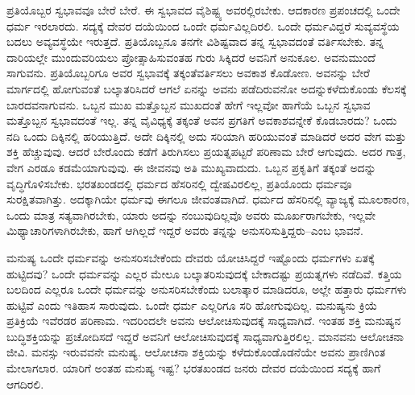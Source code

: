 ಪ್ರತಿಯೊಬ್ಬರ ಸ್ವಭಾವವೂ ಬೇರೆ ಬೇರೆ. ಈ ಸ್ವಭಾವದ ವೈಶಿಷ್ಟ್ಯ ಅವರಲ್ಲಿರಬೇಕು. ಆದಕಾರಣ ಪ್ರಪಂಚದಲ್ಲಿ ಒಂದೇ ಧರ್ಮ ಇರಲಾರದು. ಸದ್ಯಕ್ಕೆ ದೇವರ ದಯೆಯಿಂದ ಒಂದೇ ಧರ್ಮವಿಲ್ಲದಿರಲಿ. ಒಂದೇ ಧರ್ಮವಿದ್ದರೆ ಸುವ್ಯವಸ್ಥೆಯ ಬದಲು ಅವ್ಯವಸ್ಥೆಯೇ ಇರುತ್ತದೆ. ಪ್ರತಿಯೊಬ್ಬನೂ ತನಗೇ ವಿಶಿಷ್ಟವಾದ ತನ್ನ ಸ್ವಭಾವದಂತೆ ವರ್ತಿಸಬೇಕು. ತನ್ನ ದಾರಿಯಲ್ಲೇ ಮುಂದುವರಿಯಲು ಪ್ರೋತ್ಸಾಹಿಸುವಂತಹ ಗುರು ಸಿಕ್ಕಿದರೆ ಅವನಿಗೆ ಅನುಕೂಲ. ಅವನು\break ಮುಂದೆ ಸಾಗುವನು. ಪ್ರತಿಯೊಬ್ಬರಿಗೂ ಅವರ ಸ್ವಭಾವಕ್ಕೆ ತಕ್ಕಂತೆ\break ವರ್ತಿಸಲು ಅವಕಾಶ ಕೊಡೋಣ. ಅವನನ್ನು ಬೇರೆ ಮಾರ್ಗದಲ್ಲಿ ಹೋಗುವಂತೆ ಬಲ್ಕಾತರಿಸಿದರೆ ಆಗಲೆ ಏನನ್ನು ಅವನು ಪಡೆದಿರುವನೋ ಅದನ್ನು\break ಕಳೆದುಕೊಂಡು ಕೆಲಸಕ್ಕೆ ಬಾರದವನಾಗುವನು. ಒಬ್ಬನ ಮುಖ ಮತ್ತೊಬ್ಬನ ಮುಖದಂತೆ ಹೇಗೆ ಇಲ್ಲವೋ ಹಾಗೆಯೆ ಒಬ್ಬನ ಸ್ವಭಾವ ಮತ್ತೊಬ್ಬನ ಸ್ವಭಾವದಂತೆ ಇಲ್ಲ. ತನ್ನ ವೈವಿಧ್ಯಕ್ಕೆ ತಕ್ಕಂತೆ ಅವನ ಪ್ರಗತಿಗೆ ಅವಕಾಶವನ್ನೇಕೆ ಕೊಡಬಾರದು? ಒಂದು ನದಿ ಒಂದು ದಿಕ್ಕಿನಲ್ಲಿ ಹರಿಯುತ್ತಿದೆ. ಅದೇ ದಿಕ್ಕಿನಲ್ಲಿ ಅದು ಸರಿಯಾಗಿ ಹರಿಯುವಂತೆ ಮಾಡಿದರೆ ಅದರ ವೇಗ ಮತ್ತು ಶಕ್ತಿ ಹೆಚ್ಚುವುವು. ಆದರೆ ಬೇರೊಂದು ಕಡೆಗೆ ತಿರುಗಿಸಲು ಪ್ರಯತ್ನಪಟ್ಟರೆ ಪರಿಣಾಮ ಬೇರೆ ಆಗುವುದು. ಅದರ ಗಾತ್ರ, ವೇಗ ಎರಡೂ ಕಡಮೆಯಾಗುವುವು. ಈ ಜೀವನವು ಅತಿ ಮುಖ್ಯವಾದುದು. ಒಬ್ಬನ ಪ್ರಕೃತಿಗೆ ತಕ್ಕಂತೆ ಅದನ್ನು ವೃದ್ಧಿಗೊಳಿಸಬೇಕು. ಭರತಖಂಡದಲ್ಲಿ ಧರ್ಮದ ಹೆಸರಿನಲ್ಲಿ ದ್ವೇಷವಿರಲಿಲ್ಲ, ಪ್ರತಿಯೊಂದು ಧರ್ಮವೂ ಸುರಕ್ಷಿತವಾಗಿತ್ತು. ಅದಕ್ಕಾಗಿಯೇ ಧರ್ಮವು ಈಗಲೂ ಜೀವಂತವಾಗಿದೆ. ಧರ್ಮದ ಹೆಸರಿನಲ್ಲಿ ವ್ಯಾಜ್ಯಕ್ಕೆ ಮೂಲಕಾರಣ, ಒಂದು ಮಾತ್ರ ಸತ್ಯವಾಗಿರಬೇಕು, ಯಾರು ಅದನ್ನು ನಂಬುವುದಿಲ್ಲವೊ ಅವರು ಮೂರ್ಖರಾಗಬೇಕು, ಇಲ್ಲವೇ ಮಿಥ್ಯಾಚಾರಿಗಳಾಗಿರಬೇಕು, ಹಾಗೆ ಆಗಿಲ್ಲದೆ ಇದ್ದರೆ ಅವರು ತನ್ನನ್ನು ಅನುಸರಿಸುತ್ತಿದ್ದರು–ಎಂಬ ಭಾವನೆ.

ಮನುಷ್ಯ ಒಂದೇ ಧರ್ಮವನ್ನು ಅನುಸರಿಸಬೇಕೆಂದು ದೇವರು ಯೋಚಿಸಿದ್ದರೆ ಇಷ್ಟೊಂದು ಧರ್ಮಗಳು ಏತಕ್ಕೆ ಹುಟ್ಟಿದವು? ಒಂದೇ ಧರ್ಮವನ್ನು ಎಲ್ಲರ ಮೇಲೂ ಬಲ್ಕಾತರಿಸುವುದಕ್ಕೆ ಬೇಕಾದಷ್ಟು ಪ್ರಯತ್ನಗಳು ನಡೆದಿವೆ. ಕತ್ತಿಯ ಬಲದಿಂದ ಎಲ್ಲರೂ ಒಂದೇ ಧರ್ಮವನ್ನು ಅನುಸರಿಸಬೇಕೆಂದು ಬಲಾತ್ಕಾರ ಮಾಡಿದರೂ, ಅಲ್ಲೇ ಹತ್ತಾರು ಧರ್ಮಗಳು ಹುಟ್ಟಿವೆ ಎಂದು ಇತಿಹಾಸ ಸಾರುವುದು. ಒಂದೇ ಧರ್ಮ ಎಲ್ಲರಿಗೂ ಸರಿ ಹೋಗುವುದಿಲ್ಲ. ಮನುಷ್ಯನು ಕ್ರಿಯೆ ಪ್ರತಿಕ್ರಿಯೆ ಇವೆರಡರ ಪರಿಣಾಮ. ಇದರಿಂದಲೇ ಅವನು ಆಲೋಚಿಸುವುದಕ್ಕೆ ಸಾಧ್ಯವಾಗಿದೆ. ಇಂತಹ ಶಕ್ತಿ ಮನುಷ್ಯನ ಬುದ್ಧಿಶಕ್ತಿಯನ್ನು ಪ್ರಚೋದಿಸದೆ ಇದ್ದರೆ ಅವನಿಗೆ ಆಲೋಚಿಸುವುದಕ್ಕೆ ಸಾಧ್ಯವಾಗುತ್ತಿರಲಿಲ್ಲ. ಮಾನವನು ಆಲೋಚನಾ ಜೀವಿ. ಮನಸ್ಸು ಇರುವವನೇ ಮನುಷ್ಯ. ಆಲೋಚನಾ ಶಕ್ತಿಯನ್ನು ಕಳೆದುಕೊಂಡೊಡನೆಯೇ ಅವನು ಪ್ರಾಣಿಗಿಂತ ಮೇಲಾಗಲಾರ. ಯಾರಿಗೆ ಅಂತಹ ಮನುಷ್ಯ ಇಷ್ಟ? ಭರತಖಂಡದ ಜನರು ದೇವರ ದಯೆಯಿಂದ ಸದ್ಯಕ್ಕೆ ಹಾಗೆ ಆಗದಿರಲಿ.

